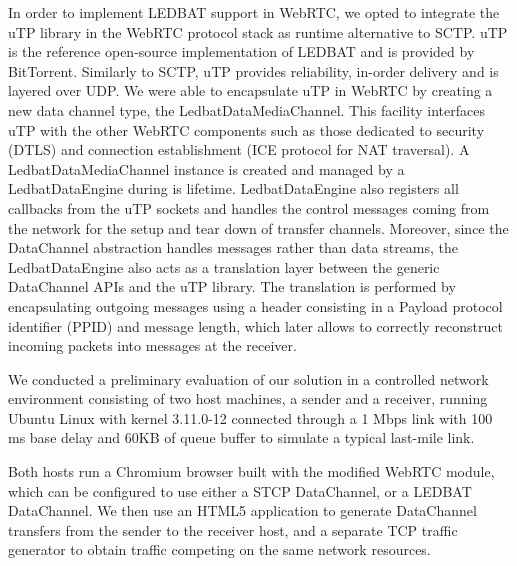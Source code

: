 \documentclass{sig-alternate}
\begin{document}
In order to implement LEDBAT support in WebRTC, we opted to integrate the uTP
library \cite{utp-repo} in the WebRTC protocol stack as runtime alternative to SCTP. uTP
is the reference open-source implementation of LEDBAT and is provided by BitTorrent.
Similarly to SCTP, uTP provides reliability, in-order delivery and is layered over UDP. We
were able to encapsulate uTP in WebRTC by creating a new data channel type, the
LedbatDataMediaChannel. This facility interfaces uTP with the other WebRTC components such
as those dedicated to security (DTLS) and connection establishment (ICE protocol for NAT
traversal). A LedbatDataMediaChannel instance is created and managed by a LedbatDataEngine
during is lifetime. LedbatDataEngine also registers all callbacks from the uTP sockets and
handles the control messages coming from the network for the setup and tear down of
transfer channels. Moreover, since the DataChannel abstraction handles messages rather
than data streams, the LedbatDataEngine also acts as a translation layer between the
generic DataChannel APIs and the uTP library. The translation is performed by
encapsulating outgoing messages using a header consisting in a Payload protocol identifier
(PPID) and message length, which later allows to correctly reconstruct incoming packets
into messages at the receiver.




We conducted a preliminary evaluation of our solution in a controlled network environment
consisting of two host machines, a sender and a receiver, running Ubuntu Linux with kernel
3.11.0-12 connected through a 1 Mbps link with 100 ms base delay and 60KB of queue
buffer to simulate a typical last-mile link.

%

Both hosts run a Chromium browser built with the modified WebRTC module, which can be configured to use either a STCP DataChannel, or a LEDBAT DataChannel. We then use an HTML5 application to generate DataChannel transfers from the sender to the receiver host, and a separate TCP traffic generator to obtain traffic competing on the same network resources.
\end{document}
